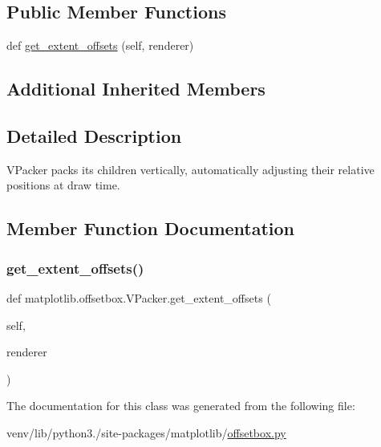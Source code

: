 \subsection*{Public Member Functions}
\begin{DoxyCompactItemize}
\item 
def \hyperlink{classmatplotlib_1_1offsetbox_1_1VPacker_a88e025a1eedafd40e47d35979698898a}{get\+\_\+extent\+\_\+offsets} (self, renderer)
\end{DoxyCompactItemize}
\subsection*{Additional Inherited Members}


\subsection{Detailed Description}
\begin{DoxyVerb}VPacker packs its children vertically, automatically adjusting their
relative positions at draw time.
\end{DoxyVerb}
 

\subsection{Member Function Documentation}
\mbox{\label{classmatplotlib_1_1offsetbox_1_1VPacker_a88e025a1eedafd40e47d35979698898a}} 
\subsubsection{\texorpdfstring{get\+\_\+extent\+\_\+offsets()}{get\_extent\_offsets()}}
{\footnotesize\ttfamily def matplotlib.\+offsetbox.\+V\+Packer.\+get\+\_\+extent\+\_\+offsets (\begin{DoxyParamCaption}\item[{}]{self,  }\item[{}]{renderer }\end{DoxyParamCaption})}



The documentation for this class was generated from the following file\+:\begin{DoxyCompactItemize}
\item 
venv/lib/python3./site-\/packages/matplotlib/\hyperlink{offsetbox_8py}{offsetbox.\+py}\end{DoxyCompactItemize}
